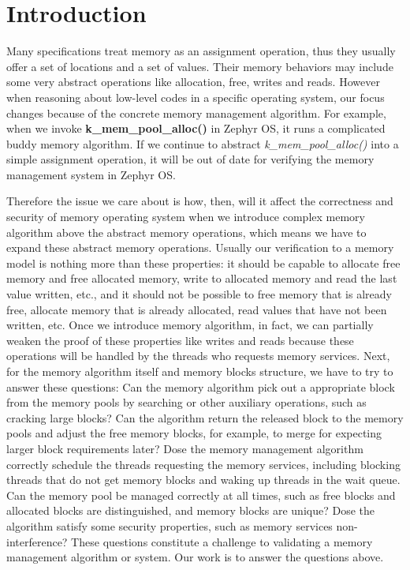 \documentclass[runningheads]{llncs}
\begin{document}
\section{Introduction}
Many specifications treat memory as an assignment operation, thus they usually offer a set of locations and a set of values. Their memory behaviors may include some very abstract operations like allocation, free, writes and reads. However when reasoning about low-level codes in a specific operating system, our focus changes because of the concrete memory management algorithm. For example, when we invoke \textbf{k\_mem\_pool\_alloc()} in Zephyr OS, it runs a complicated buddy memory algorithm. If we continue to abstract \textsl{k\_mem\_pool\_alloc()} into a simple assignment operation, it will be out of date for verifying the memory management system in Zephyr OS.

Therefore the issue we care about is how, then, will it affect the correctness and security of memory operating system when we introduce complex memory algorithm above the abstract memory operations, which means we have to expand these abstract memory operations. Usually our verification to a memory model is nothing more than these properties: it should be capable to allocate free memory and free allocated memory, write to allocated memory and read the last value written, etc., and it should not be possible to free memory that is already free, allocate memory that is already allocated, read values that have not been written, etc. Once we introduce memory algorithm, in fact, we can partially weaken the proof of these properties like writes and reads because these operations will be handled by the threads who requests memory services. Next, for the memory algorithm itself and memory blocks structure, we have to try to answer these questions: Can the memory algorithm pick out a appropriate block from the memory pools by searching or other auxiliary operations, such as cracking large blocks? Can the algorithm return the released block to the memory pools and adjust the free memory blocks, for example, to merge for expecting larger block requirements later? Dose the memory management algorithm correctly schedule the threads requesting the memory services, including blocking threads that do not get memory blocks and waking up threads in the wait queue. Can the memory pool be managed correctly at all times, such as free blocks and allocated blocks are distinguished, and memory blocks are unique? Dose the algorithm satisfy some security properties, such as memory services non-interference? These questions constitute a challenge to validating a memory management algorithm or system. Our work is to answer the questions above.
\end{document}
